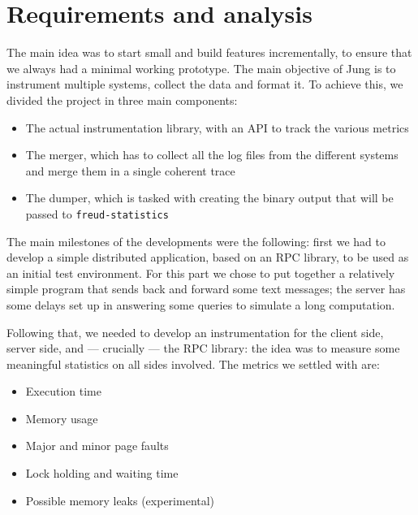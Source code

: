 \documentclass[11pt,english,singlespacing,headsepline,consistentlayout]{auxiliary/si-msc-thesis}
\begin{document}
\section{Requirements and analysis}\label{sec:requirements}


The main idea was to start small and build features incrementally, to
ensure that we always had a minimal working prototype.  The main
objective of Jung is to instrument multiple systems, collect the data
and format it.  To achieve this, we divided the project in three main
components:

\begin{itemize}
\item The actual instrumentation library, with an API to track the
various metrics
\item The merger, which has to collect all the log files from the
different systems and merge them in a single coherent trace
\item The dumper, which is tasked with creating the binary output that
will be passed to \texttt{freud-statistics}
\end{itemize}

The main milestones of the developments were the following: first we
had to develop a simple distributed application, based on an RPC
library, to be used as an initial test environment.  For this part we
chose to put together a relatively simple program that sends back and
forward some text messages; the server has some delays set up in
answering some queries to simulate a long computation.

Following that, we needed to develop an instrumentation for the client
side, server side, and --- crucially --- the RPC library: the idea was
to measure some meaningful statistics on all sides involved.  The
metrics we settled with are:

\begin{itemize}
            \item Execution time
            \item Memory usage
            \item Major and minor page faults
            \item Lock holding and waiting time
            \item Possible memory leaks (experimental)
        \end{itemize}
\end{document}
